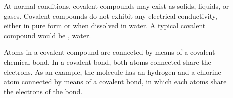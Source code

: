 \documentclass[main.tex]{subfiles}
\begin{document}
\begin{description}
\item[] At normal conditions, covalent compounds may exist as solids, liquids, or gases. Covalent compounds do not exhibit any electrical conductivity, either in pure form or when dissolved in water. A typical covalent compound would be , water.
\item[] Atoms in a covalent compound are connected by means of a covalent chemical bond. In a covalent bond, both atoms connected share the electrons. As an example, the  molecule has an hydrogen and a chlorine atom connected by means of a covalent bond, in which each atoms share the electrons of the bond. 

\end{description}


\end{document}

